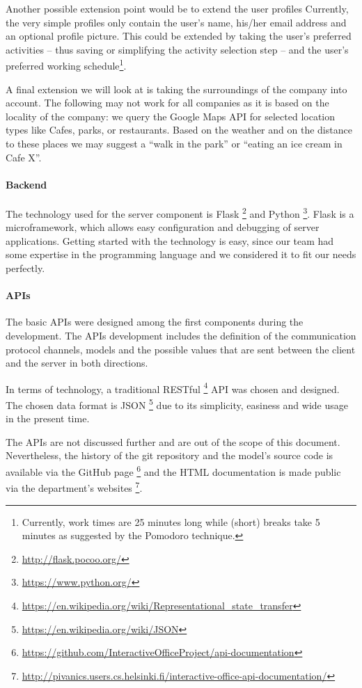 Another possible extension point would be to extend the user profiles Currently, the very simple profiles only contain 
the user's name, his/her email address and an optional profile picture. This could be extended by taking the user's 
preferred activities -- thus saving or simplifying the activity selection step -- and the user's preferred working 
schedule\footnote{Currently, work times are 25 minutes long while (short) breaks take 5 minutes as suggested by the 
Pomodoro technique.}. 

A final extension we will look at is taking the surroundings of the company into account. The following may not work 
for all companies as it is based on the locality of the company: we query the Google Maps API for selected location 
types like Cafes, parks, or restaurants. Based on the weather and on the distance to these places we may suggest a 
``walk in the park'' or  ``eating an ice cream in Cafe X''.

\paragraph{Backend}
The technology used for the server component is Flask \footnote{\url{http://flask.pocoo.org/}} and Python \footnote{\url{https://www.python.org/}}. 
Flask is a microframework, which allows easy configuration and debugging of server applications. Getting started with 
the technology is easy, since our team had some expertise in the programming language and we considered it to fit our 
needs perfectly. 

\paragraph{APIs}
The basic APIs were designed among the first components during the development. The APIs development includes the 
definition of the communication protocol channels, models and the possible values that are sent between the client and 
the server in both directions. 

In terms of technology, a traditional RESTful \footnote{\url{https://en.wikipedia.org/wiki/Representational\_state\_transfer}} 
API was chosen and designed. The chosen data format is JSON \footnote{\url{https://en.wikipedia.org/wiki/JSON}} due to 
its simplicity, easiness and wide usage in the present time. 

The APIs are not discussed further and are out of the scope of this document. Nevertheless, the history of the git 
repository and the model's source code is available via the GitHub page \footnote{\url{https://github.com/InteractiveOfficeProject/api-documentation}} 
and the HTML documentation is made public via the department's websites \footnote{\url{http://pivanics.users.cs.helsinki.fi/interactive-office-api-documentation/}}. 